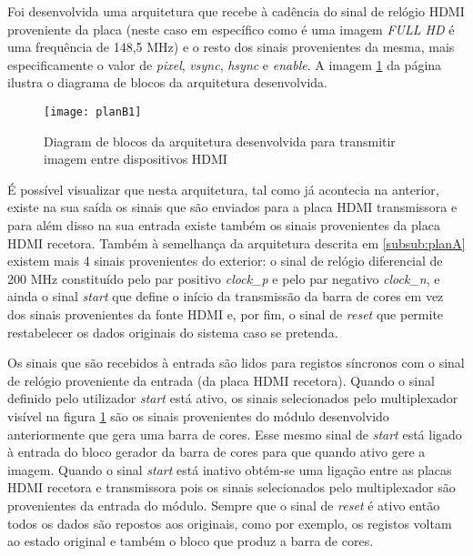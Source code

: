 Foi desenvolvida uma arquitetura que recebe à cadência do sinal de relógio HDMI proveniente da placa (neste caso em específico como é uma imagem \textit{FULL HD} é uma frequência de 148,5 MHz) e o resto dos sinais provenientes da mesma, mais especificamente o valor de \textit{pixel}, \textit{vsync}, \textit{hsync} e \textit{enable}. A imagem \ref{fig:planb1} da página \pageref{fig:planb1} ilustra o diagrama de blocos da arquitetura desenvolvida.

\begin{figure}[h!]
	\begin{center}
		\leavevmode
		\texttt{[image: planB1]}
		\caption{Diagram de blocos da arquitetura desenvolvida para transmitir imagem entre dispositivos HDMI}
		\label{fig:planb1}
	\end{center}
\end{figure}

É possível visualizar que nesta arquitetura, tal como já acontecia na anterior, existe na sua saída os sinais que são enviados para a placa HDMI transmissora e para além disso na sua entrada existe também os sinais provenientes da placa HDMI recetora. Também à semelhança da arquitetura descrita em \ref{subsub:planA} existem mais 4 sinais provenientes do exterior: o sinal de relógio diferencial de 200 MHz constituído pelo par positivo \textit{clock\_p} e pelo par negativo \textit{clock\_n}, e ainda o sinal \textit{start} que define o início da transmissão da barra de cores em vez dos sinais provenientes da fonte HDMI e, por fim, o sinal de \textit{reset} que permite restabelecer os dados originais do sistema caso se pretenda.

Os sinais que são recebidos à entrada são lidos para registos síncronos com o sinal de relógio proveniente da entrada (da placa HDMI recetora). Quando o sinal definido pelo utilizador \textit{start} está ativo, os sinais selecionados pelo multiplexador visível na figura \ref{fig:planb1} são os sinais provenientes do módulo desenvolvido anteriormente que gera uma barra de cores. Esse mesmo sinal de \textit{start} está ligado à entrada do bloco gerador da barra de cores para que quando ativo gere a imagem. Quando o sinal \textit{start} está inativo obtém-se uma ligação entre as placas HDMI recetora e transmissora pois os sinais selecionados pelo multiplexador são provenientes da entrada do módulo. Sempre que o sinal de \textit{reset} é ativo então todos os dados são repostos aos originais, como por exemplo, os registos voltam ao estado original e também o bloco que produz a barra de cores.

